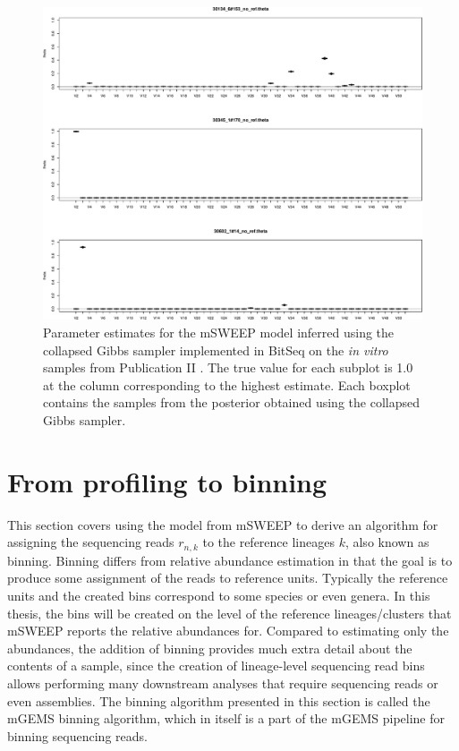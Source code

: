 \documentclass[officiallayout]{tktla}
\begin{document}
\begin{figure}[!t]
    \centering
    \includegraphics[width=\textwidth,keepaspectratio]{img/gibbs/gibbs_reals.pdf}
    \caption{Parameter estimates for the mSWEEP model inferred using
      the collapsed Gibbs sampler implemented in BitSeq
      \citep{glaus2012identifying} on the \textit{in vitro} samples
      from Publication II \citep{maklin_bacterial_2021}. The true
      value for each subplot is 1.0 at the column corresponding to the
      highest estimate. Each boxplot contains the samples from the
      posterior obtained using the collapsed Gibbs sampler.}
    \label{fig:gibbs-estimates}
\end{figure}

\section{From profiling to binning}
\label{section:binning}

This section covers using the model from mSWEEP to derive an
algorithm for assigning the sequencing reads $r_{n, k}$ to the
reference lineages $k$, also known as binning. Binning differs from
relative abundance estimation in that the goal is to produce some
assignment of the reads to reference units. Typically the reference
units and the created bins correspond to some species or even
genera. In this thesis, the bins will be created on the level of the
reference lineages/clusters that mSWEEP reports the relative
abundances for. Compared to estimating only the abundances, the
addition of binning provides much extra detail about the contents of a
sample, since the creation of lineage-level sequencing read bins
allows performing many downstream analyses that require sequencing
reads or even assemblies. The binning algorithm presented in this
section is called the mGEMS binning algorithm, which in itself is a
part of the mGEMS pipeline for binning sequencing reads.
\end{document}
